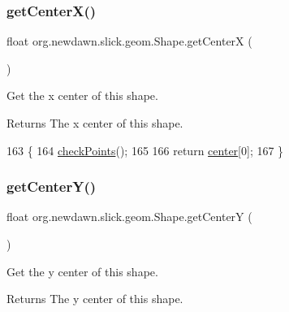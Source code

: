 \subsubsection{\texorpdfstring{get\+Center\+X()}{getCenterX()}}
{\footnotesize\ttfamily float org.\+newdawn.\+slick.\+geom.\+Shape.\+get\+CenterX (\begin{DoxyParamCaption}{ }\end{DoxyParamCaption})\hspace{0.3cm}{\ttfamily [inline]}}

Get the x center of this shape.

\begin{DoxyReturn}{Returns}
The x center of this shape. 
\end{DoxyReturn}

\begin{DoxyCode}
163                               \{
164         \mbox{\hyperlink{classorg_1_1newdawn_1_1slick_1_1geom_1_1_shape_a84293802d05e8666a441720bfc12745d}{checkPoints}}();
165         
166         \textcolor{keywordflow}{return} \mbox{\hyperlink{classorg_1_1newdawn_1_1slick_1_1geom_1_1_shape_a15ecde3336c4310cd927d766bb9a0b3b}{center}}[0];
167     \}
\end{DoxyCode}
\mbox{\label{classorg_1_1newdawn_1_1slick_1_1geom_1_1_shape_a9937c71e414375a9974c7a5d8fcc06e5}} 
\subsubsection{\texorpdfstring{get\+Center\+Y()}{getCenterY()}}
{\footnotesize\ttfamily float org.\+newdawn.\+slick.\+geom.\+Shape.\+get\+CenterY (\begin{DoxyParamCaption}{ }\end{DoxyParamCaption})\hspace{0.3cm}{\ttfamily [inline]}}

Get the y center of this shape.

\begin{DoxyReturn}{Returns}
The y center of this shape. 
\end{DoxyReturn}


